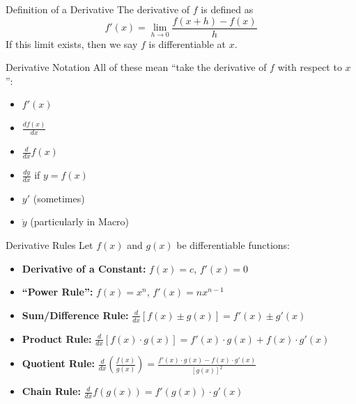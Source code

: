 \documentclass[aspectratio=169]{beamer}
\begin{document}
\begin{frame}{Definition of a Derivative}\label{main1}
The derivative of \(f\) is defined as
\[
f'(x) = \lim_{h \to 0} \frac{f(x + h) - f(x)}{h}
\]
If this limit exists, then we say \(f\) is differentiable at \(x\).

\end{frame}

\begin{frame}{Derivative Notation}\label{main1}
All of these mean “take the derivative of \(f\) with respect to \(x\)”:
\begin{itemize}
\begin{itemize}
    \item \(f'(x)\)
    \item \(\frac{df(x)}{dx}\)
    \item \(\frac{d}{dx} f(x)\)
    \item \(\frac{dy}{dx}\) if \(y = f(x)\)
    \item \(y'\) (sometimes)
    \item \( \dot{y} \) (particularly in Macro)
\end{itemize}
\end{itemize}
\end{frame}

\begin{frame}{Derivative Rules}\label{main1}
Let \(f(x)\) and \(g(x)\) be differentiable functions:
\begin{itemize}
    \item \textbf{Derivative of a Constant:} \(f(x) = c\), \(f'(x) = 0\)
    \item \textbf{“Power Rule”:} \(f(x) = x^n\), \(f'(x) = nx^{n-1}\) 
    \item \textbf{Sum/Difference Rule:} \quad $\frac{d}{dx} [f(x) \pm g(x)] = f'(x) \pm g'(x)$
    \item \textbf{Product Rule:} \quad $\frac{d}{dx} [f(x) \cdot g(x)] = f'(x) \cdot g(x) + f(x) \cdot g'(x)$
    \item \textbf{Quotient Rule:} \quad $\frac{d}{dx} \left( \frac{f(x)}{g(x)} \right) = \frac{f'(x) \cdot g(x) - f(x) \cdot g'(x)}{[g(x)]^2}$
    \item \textbf{Chain Rule:} \quad $\frac{d}{dx} f(g(x)) = f'(g(x)) \cdot g'(x)$
\end{itemize}
\end{frame}
\end{document}
